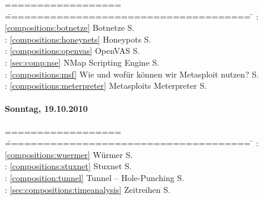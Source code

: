 \begin{tabbing}
  ================== \= ====================================== \= \kill
  \DH: \> \ref{compositions:botnetze} Botnetze                                \> S.~\pageref{compositions:botnetze} \\
  \MW: \> \ref{compositions:honeynets} Honeypots                              \> S.~\pageref{compositions:honeynets} \\
  \JF: \> \ref{compositions:openvas} OpenVAS                                  \> S.~\pageref{compositions:openvas} \\
  \BK: \> \ref{sec:comp:nse} NMap Scripting Engine                            \> S.~\pageref{sec:comp:nse} \\
  \DE: \> \ref{compositions:msf} Wie und wofür können wir Metasploit nutzen?  \> S.~\pageref{compositions:msf} \\
  \HM: \> \ref{compositions:meterpreter} Metasploits Meterpreter              \> S.~\pageref{compositions:meterpreter} \\
\end{tabbing}

\paragraph*{Sonntag, 19.10.2010}

\begin{tabbing}
  ================== \= ====================================== \= \kill
  \WF: \> \ref{compositions:wuermer} Würmer                   \> S.~\pageref{compositions:wuermer} \\
  \DM: \> \ref{compositions:stuxnet} Stuxnet                  \> S.~\pageref{compositions:stuxnet} \\
  \CA: \> \ref{composition:tunnel} Tunnel -- Hole-Punching    \> S.~\pageref{composition:tunnel} \\
  \DK: \> \ref{sec:compositions:timeanalysis} Zeitreihen      \> S.~\pageref{sec:compositions:timeanalysis} \\
\end{tabbing}



% 
% 
% 

\clearpage %
\clearpage %

\clearpage %
\clearpage %
\clearpage %
\clearpage %
\clearpage %
\clearpage %

\clearpage %
\clearpage %
\clearpage %
\clearpage %
